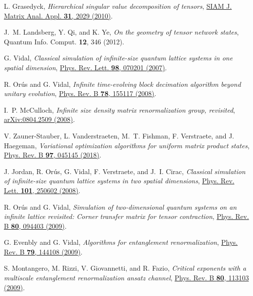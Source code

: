 \documentclass[english,11pt,aps,pra,onecolumn,tightenlines,groupedaddress,superscriptaddress,notitlepage,floatfix,fleqn]{revtex4-1}
\begin{document}
\begin{thebibliography}{10}
L. Grasedyck, {\em Hierarchical singular value decomposition of tensors},
  \href{https://doi.org/10.1137/090764189} {SIAM J. Matrix Anal. Appl. {\bf
  31},  2029  (2010)}.

J.~M. Landsberg, Y. Qi, and K. Ye, {\em On the geometry of tensor network
  states}, {Quantum Info. Comput. {\bf 12},  346  (2012)}.

G. Vidal, {\em Classical simulation of infinite-size quantum lattice systems in
  one spatial dimension}, \href{https://doi.org/10.1103/PhysRevLett.98.070201}
  {Phys. Rev. Lett. {\bf 98},  070201  (2007)}.

R. Or\'{u}s and G. Vidal, {\em Infinite time-evolving block decimation
  algorithm beyond unitary evolution},
  \href{https://doi.org/10.1103/PhysRevB.78.155117} {Phys. Rev. B {\bf 78},
  155117  (2008)}.

I.~P. McCulloch, {\em Infinite size density matrix renormalization group,
  revisited}, \href{http://arxiv.org/abs/0804.2509} {arXiv:0804.2509  (2008)}.

V. Zauner-Stauber, L. Vanderstraeten, M.~T. Fishman, F. Verstraete, and J.
  Haegeman, {\em Variational optimization algorithms for uniform matrix product
  states}, \href{https://doi.org/10.1103/PhysRevB.97.045145} {Phys. Rev. B {\bf
  97},  045145  (2018)}.

J. Jordan, R. Or\'{u}s, G. Vidal, F. Verstraete, and J.~I. Cirac, {\em
  Classical simulation of infinite-size quantum lattice systems in two spatial
  dimensions}, \href{https://doi.org/10.1103/PhysRevLett.101.250602} {Phys.
  Rev. Lett. {\bf 101},  250602  (2008)}.

R. Or\'{u}s and G. Vidal, {\em Simulation of two-dimensional quantum systems on
  an infinite lattice revisited: Corner transfer matrix for tensor
  contraction}, \href{https://doi.org/10.1103/PhysRevB.80.094403} {Phys. Rev. B
  {\bf 80},  094403  (2009)}.

G. Evenbly and G. Vidal, {\em Algorithms for entanglement renormalization},
  \href{https://doi.org/10.1103/PhysRevB.79.144108} {Phys. Rev. B {\bf 79},
  144108  (2009)}.

S. Montangero, M. Rizzi, V. Giovannetti, and R. Fazio, {\em Critical exponents
  with a multiscale entanglement renormalization ansatz channel},
  \href{https://doi.org/10.1103/PhysRevB.80.113103} {Phys. Rev. B {\bf 80},
  113103  (2009)}.


\end{thebibliography}
\end{document}
